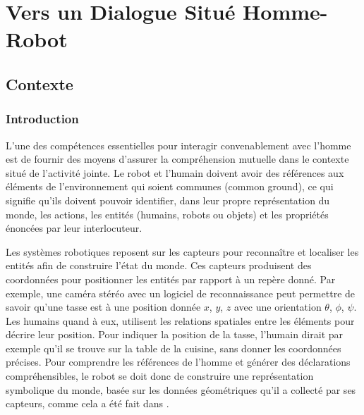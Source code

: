 \documentclass[a4paper,11pt,twoside]{StyleThese}
\begin{document}
\setcounter{chapter}{2} %
\dominitoc
\faketableofcontents
\fi

\chapter{Vers un Dialogue Situé Homme-Robot}
\label{chapter3}
\minitoc

\section{Contexte}

\subsection{Introduction}
L'une des compétences essentielles pour interagir convenablement avec l'homme est de fournir des moyens d'assurer la compréhension mutuelle dans le contexte situé de l'activité jointe. Le robot et l'humain doivent avoir des références aux éléments de l'environnement qui soient communes (common ground), ce qui signifie qu'ils doivent pouvoir identifier, dans leur propre représentation du monde, les actions, les entités (humains, robots ou objets) et les propriétés énoncées par leur interlocuteur.

Les systèmes robotiques reposent sur les capteurs pour reconnaître et localiser les entités afin de construire l'état du monde. Ces capteurs produisent des coordonnées pour positionner les entités par rapport à un repère donné. Par exemple, une caméra stéréo avec un logiciel de reconnaissance peut permettre de savoir qu'une tasse est à une position donnée  $x$, $y$, $z$ avec une orientation $\theta$, $\phi$, $\psi$.
Les humains quand à eux, utilisent les relations spatiales entre les éléments pour décrire leur position. Pour indiquer la position de la tasse, l'humain dirait par exemple qu'il se trouve sur la table de la cuisine, sans donner les coordonnées précises.
Pour comprendre les références de l'homme et générer des déclarations compréhensibles, le robot se doit donc de construire une représentation symbolique du monde, basée sur les données géométriques qu'il a collecté par ses capteurs, comme cela a été fait dans \cite{lemaignan2012grounding}.

\end{document}
